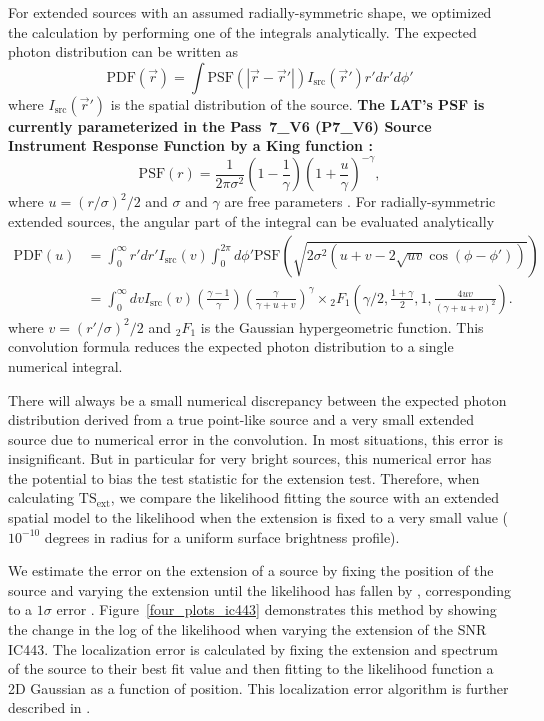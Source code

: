 \documentclass[12pt,preprint]{aastex}
\newcommand{\tsext}{{\ensuremath{\text{TS}_{\text{ext}}}}\xspace}
\newcommand{\newtext}[1]{{\bfseries \color{red}#1}}
\begin{document}
For extended sources with an assumed radially-symmetric shape,
we optimized the calculation by performing one
of the integrals analytically.
The expected photon 
distribution can be written as
\begin{equation}
  \text{PDF}(\vec r) = \int  \text{PSF}(|\vec r - \vec r'|)I_\text{src}(\vec r') r' dr' d\phi'
\end{equation}
where $I_\text{src}(\vec r')$ is the spatial distribution of the
source.
\newtext{
The LAT's PSF is currently parameterized 
in the Pass~7\_V6 (P7\_V6) Source Instrument
Response Function \citep[IRFs,][]{lat_on_orbit_psf} by a King function \citep{king_function}:
}
\begin{equation}
  \text{PSF}(r) = 
  \frac{1}{2\pi\sigma^2}
  \left(1-\frac{1}{\gamma}\right)
  \left(1+\frac{u}{\gamma}\right)^{-\gamma},
\end{equation}
where $u=(r/\sigma)^2/2$ and $\sigma$ and $\gamma$ are free parameters
\citep{matthew_kerr_thesis}.  For radially-symmetric extended sources,
the angular part of the integral can be evaluated analytically
\begin{align}
  \text{PDF}(u) & = \int_0^\infty r' dr'
  I_\text{src}(v) 
  \int_0^{2\pi} d\phi' 
  \text{PSF}(\sqrt{2\sigma^2(u+v-2\sqrt{uv}\cos(\phi-\phi'))})
  \\
  & = \int_0^\infty dv
  I_\text{src}(v) 
  \left(\frac{\gamma-1}{\gamma}\right)
  \left( \frac{\gamma}{\gamma + u + v}\right)^\gamma 
  \times {}_2F_1 \left(\gamma/2,\frac{1+\gamma}{2},1,\frac{4uv}{(\gamma+u+v)^2}\right).
\end{align}
where $v=(r'/\sigma)^2/2$ and ${}_2F_1$ is the Gaussian hypergeometric
function.  This convolution formula reduces the expected photon
distribution to a single numerical integral.

There will always be a small numerical discrepancy between the expected
photon distribution derived from a true point-like source and a very small
extended source due to numerical error in the convolution.  In most
situations, this error is insignificant.  But in particular for
very bright sources, this numerical error has the potential to bias the
test statistic for the extension test. Therefore, when calculating
\tsext, we compare the likelihood fitting the source with an extended
spatial model to the likelihood when the extension is
fixed to a very small value ($10^{-10}$ degrees in radius 
for a uniform surface brightness profile).

We estimate the error on the extension of a source by fixing
the position of the source and varying the extension until the
likelihood has fallen by \onehalf, corresponding to a $1\sigma$ error
\citep{Statistical_methods_book}.  Figure~\ref{four_plots_ic443}
demonstrates this method by showing the change in the log of the
likelihood when varying the extension of the SNR IC443.  The localization
error is calculated by fixing the extension and spectrum of the source
to their best fit value and then
fitting to the likelihood function a 2D Gaussian as a function
of position. This localization error algorithm is further described in
\cite{second_cat}.
\end{document}
